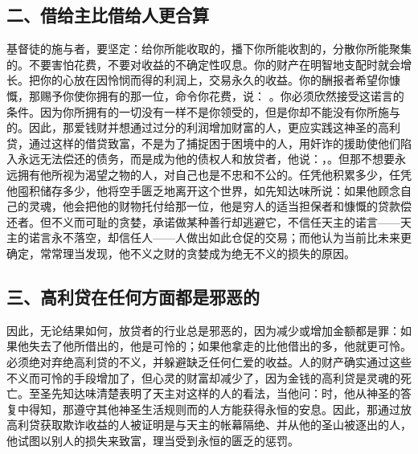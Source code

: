 
\subsection{二、借给主比借给人更合算}

基督徒的施与者，要坚定：给你所能收取的，播下你所能收割的，分散你所能聚集的。不要害怕花费，不要对收益的不确定性叹息。你的财产在明智地支配时就会增长。把你的心放在因怜悯而得的利润上，交易永久的收益。你的酬报者希望你慷慨，那赐予你使你拥有的那一位，命令你花费，说： 。你必须欣然接受这诺言的条件。因为你所拥有的一切没有一样不是你领受的，但是你却不能没有你所施与的。因此，那爱钱财并想通过过分的利润增加财富的人，更应实践这神圣的高利贷，通过这样的借贷致富，不是为了捕捉困于困境中的人，用奸诈的援助使他们陷入永远无法偿还的债务，而是成为他的债权人和放贷者，他说：，。但那不想要永远拥有他所视为渴望之物的人，对自己也是不忠和不公的。任凭他积累多少，任凭他囤积储存多少，他将空手匮乏地离开这个世界，如先知达味所说：如果他顾念自己的灵魂，他会把他的财物托付给那一位，他是穷人的适当担保者和慷慨的贷款偿还者。但不义而可耻的贪婪，承诺做某种善行却逃避它，不信任天主的诺言——天主的诺言永不落空，却信任人——人做出如此仓促的交易；而他认为当前比未来更确定，常常理当发现，他不义之财的贪婪成为绝无不义的损失的原因。\par


\subsection{三、高利贷在任何方面都是邪恶的}

因此，无论结果如何，放贷者的行业总是邪恶的，因为减少或增加金额都是罪：如果他失去了他所借出的，他是可怜的；如果他拿走的比他借出的多，他就更可怜。必须绝对弃绝高利贷的不义，并躲避缺乏任何仁爱的收益。人的财产确实通过这些不义而可怜的手段增加了，但心灵的财富却减少了，因为金钱的高利贷是灵魂的死亡。至圣先知达味清楚表明了天主对这样的人的看法，当他问：时，他从神圣的答复中得知，那遵守其他神圣生活规则而的人方能获得永恒的安息。因此，那通过放高利贷获取欺诈收益的人被证明是与天主的帐幕隔绝、并从他的圣山被逐出的人，他试图以别人的损失来致富，理当受到永恒的匮乏的惩罚。\par

